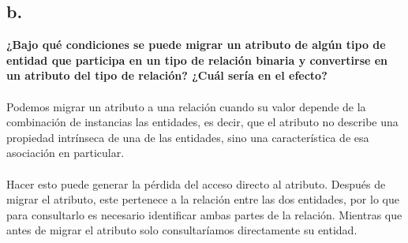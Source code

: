 \subsection*{b. }

\textbf{¿Bajo qué condiciones se puede migrar un atributo de algún tipo de entidad que participa en un tipo de relación binaria y convertirse en un atributo del tipo de relación? ¿Cuál sería en el efecto?}\\ \\
Podemos migrar un atributo a una relación cuando su valor depende de la combinación de instancias las entidades, es decir, que el atributo no describe una propiedad intrínseca de una de las entidades, sino una característica de esa asociación en particular.\\ \\
Hacer esto puede generar la pérdida del acceso directo al atributo. Después de migrar el atributo, este pertenece a la relación entre las dos entidades, por lo que para consultarlo es necesario identificar ambas partes de la relación. Mientras que antes de migrar el atributo solo consultaríamos directamente su entidad.